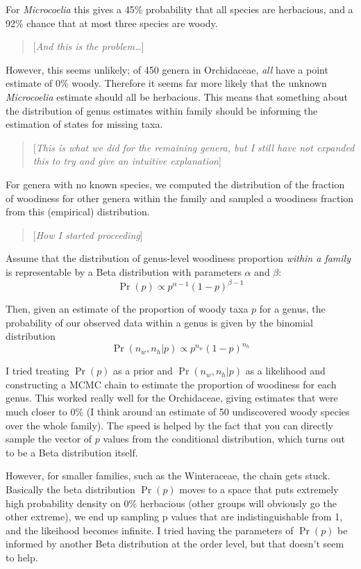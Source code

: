 \documentclass[12pt]{article}
\newcommand{\mycomment}[1]{\begin{quote}[\textit{#1}]\end{quote}}
\begin{document}
For \textit{Microcoelia} this gives a 45\% probability that all
species are herbacious, and a 92\% chance that at most three species
are woody.

\mycomment{And this is the problem\ldots}

However, this seems unlikely; of 450 genera in Orchidaceae,
\textit{all} have a point estimate of 0\% woody.  Therefore it seems
far more likely that the unknown \textit{Microcoelia} estimate should
all be herbacious.  This means that something about the distribution
of genus estimates within family should be informing the estimation of
states for missing taxa.

\mycomment{This is what we did for the remaining genera, but I still have
  not expanded this to try and give an intuitive explanation}

For genera with no known species, we computed the distribution of the
fraction of woodiness for other genera within the family and sampled a
woodiness fraction from this (empirical) distribution.

\mycomment{How I started proceeding}

Assume that the distribution of genus-level woodiness proportion
\textit{within a family} is representable by a Beta distribution with
parameters $\alpha$ and $\beta$:
\begin{equation}
  \Pr(p) \propto p^{\alpha - 1}(1 - p)^{\beta - 1}
\end{equation}

Then, given an estimate of the proportion of woody taxa $p$ for a
genus, the probability of our observed data within a genus is given by
the binomial distribution
\begin{equation}
  \Pr(n_w, n_h | p) \propto p^{n_w}(1 - p)^{n_h}
\end{equation}

I tried treating $\Pr(p)$ as a prior and $\Pr(n_w, n_h | p)$ as a
likelihood and constructing a MCMC chain to estimate the proportion of
woodiness for each genus.  This worked really well for the
Orchidaceae, giving estimates that were much closer to 0\% (I think
around an estimate of 50 undiscovered woody species over the whole
family).  The speed is helped by the fact that you can directly
sample the vector of $p$ values from the conditional distribution,
which turns out to be a Beta distribution itself.

However, for smaller families, such as the Winteraceae, the chain gets
stuck.  Basically the beta distribution $\Pr(p)$ moves to a space that
puts extremely high probability density on 0\% herbacious (other
groups will obviously go the other extreme), we end up sampling p
values that are indistinguishable from 1, and the likeihood becomes
infinite.  I tried having the parameters of $\Pr(p)$ be informed by
another Beta distribution at the order level, but that doesn't seem to
help.
\end{document}
